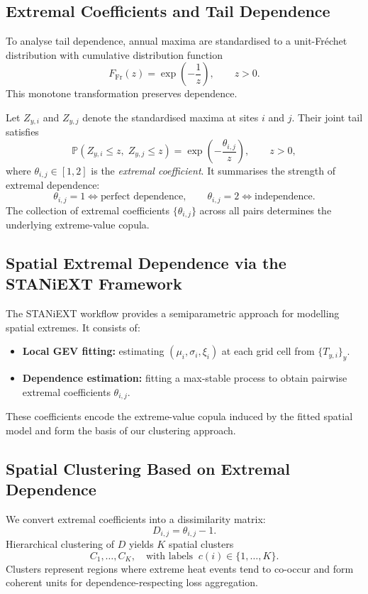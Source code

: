 \documentclass[12pt]{article}
\begin{document}
\subsection{Extremal Coefficients and Tail Dependence}

To analyse tail dependence, annual maxima are standardised to a unit-Fr\'echet
distribution with cumulative distribution function
\[
F_{\mathrm{Fr}}(z) = \exp\!\left(-\frac{1}{z}\right), \qquad z>0.
\]
This monotone transformation preserves dependence.

Let $Z_{y,i}$ and $Z_{y,j}$ denote the standardised maxima at sites $i$ and $j$.
Their joint tail satisfies
\[
\mathbb{P}(Z_{y,i} \le z,\; Z_{y,j} \le z)
=
\exp\!\left(-\frac{\theta_{i,j}}{z}\right), \qquad z>0,
\]
where $\theta_{i,j} \in [1,2]$ is the \emph{extremal coefficient}. It summarises the strength
of extremal dependence:
\[
\theta_{i,j}=1 \iff \text{perfect dependence}, \qquad 
\theta_{i,j}=2 \iff \text{independence}.
\]
The collection of extremal coefficients $\{\theta_{i,j}\}$ across all pairs determines the
underlying extreme-value copula.

\subsection{Spatial Extremal Dependence via the STANiEXT Framework}

The STANiEXT workflow provides a semiparametric approach for modelling spatial
extremes. It consists of:

\begin{itemize}
\item \textbf{Local GEV fitting:} estimating $(\mu_i,\sigma_i,\xi_i)$ at each grid cell from $\{T_{y,i}\}_y$.
\item \textbf{Dependence estimation:} fitting a max-stable process to obtain pairwise extremal coefficients $\theta_{i,j}$.
\end{itemize}

These coefficients encode the extreme-value copula induced by the fitted spatial model and
form the basis of our clustering approach.

\subsection{Spatial Clustering Based on Extremal Dependence}

We convert extremal coefficients into a dissimilarity matrix:
\[
D_{i,j} = \theta_{i,j} - 1.
\]
Hierarchical clustering of $D$ yields $K$ spatial clusters
\[
C_1,\dots,C_K,
\quad\text{with labels }\ c(i) \in \{1,\dots,K\}.
\]
Clusters represent regions where extreme heat events tend to co-occur and form coherent
units for dependence-respecting loss aggregation.
\end{document}
